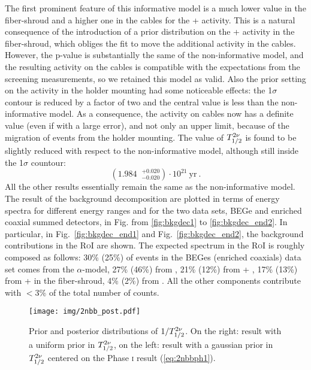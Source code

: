  The first prominent feature of this informative model is a much lower value in the fiber-shroud and a higher one in the cables for the  +  activity. This is a natural consequence of the introduction of a prior distribution on the  +  activity in the fiber-shroud, which obliges the fit to move the additional activity in the cables. However, the p-value is substantially the same of the non-informative model, and the resulting activity on the cables is compatible with the expectations from the screening measurements, so we retained this model as valid. Also the prior setting on the  activity in the holder mounting had some noticeable effects: the 1$\sigma$ contour is reduced by a factor of two and the central value is less than the non-informative model. As a consequence, the  activity on cables now has a definite value (even if with a large error), and not only an upper limit, because of the migration of events from the holder mounting. The value of $T_{1/2}^{2\nu}$ is found to be slightly reduced with respect to the non-informative model, although still inside the 1$\sigma$ countour:
\begin{equation}(1.984\;\;^{+0.020}_{-0.020})\cdot10^{21}\ \text{yr}\ .\label{eq:stat_result}\end{equation}
	All the other results essentially remain the same as the non-informative model. The result of the background decomposition are plotted in terms of energy spectra for different energy ranges and for the two data sets, BEGe and enriched coaxial summed detectors, in Fig. from \ref{fig:bkgdec1} to \ref{fig:bkgdec_end2}. In particular, in Fig.~\ref{fig:bkgdec_end1} and Fig.~\ref{fig:bkgdec_end2}, the background contributions in the \textsc{RoI} are shown. The expected spectrum in the \textsc{RoI} is roughly composed as follows: 30\% (25\%) of events in the BEGes (enriched coaxials) data set comes from the $\alpha$-model, 27\% (46\%) from , 21\% (12\%) from  + , 17\% (13\%) from  +  in the fiber-shroud, 4\% (2\%) from . All the other components contribute with $<3\%$ of the total number of counts.
\begin{figure}
	\centering
	\texttt{[image: img/2nbb\_post.pdf]}
	\caption{Prior and posterior distributions of $1/T_{1/2}^{2\nu}$. On the right: result with a uniform prior in $T_{1/2}^{2\nu}$, on the left: result with a gaussian prior in $T_{1/2}^{2\nu}$ centered on the {\gerda} Phase \textsc{i} result (\ref{eq:2nbbph1}).}\label{fig:2nbbpost}
\end{figure}
